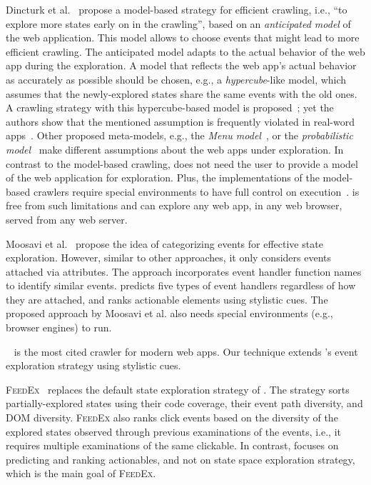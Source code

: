 Dincturk et al.~\cite{Dincturk:2014:ModelBasedForRIA:TWEB} propose a model-based strategy for efficient crawling,
i.e., ``to explore more states early on in the crawling'',
based on an \textit{anticipated model} of the web application.
This model allows to choose events that might lead to more efficient crawling.
The anticipated model adapts to the actual behavior of the web app during the exploration.
A model that reflects the web app's actual behavior as accurately as possible should be chosen,
e.g., a \textit{hypercube}-like model,
which assumes that the newly-explored states share the same events with the old ones.
A crawling strategy with this hypercube-based model is proposed~\cite{Benjamin:2007:StrategyHypercube:Thesis, Benjamin:2011:StrategyHypercube:ICWE};
yet the authors show that the mentioned assumption is frequently violated in real-word apps~\cite{Dincturk:2014:ModelBasedForRIA:TWEB}.
Other proposed meta-models, e.g., the \textit{Menu model}~\cite{Choudhary:2012:MCrawler:Thesis, Choudhary:2013:MenuModel:ICWE},
or the \textit{probabilistic model}~\cite{Dincturk:2012:StatisticalStrategy, Dincturk:2013:ModelBasedCrawlingStrategy} make different assumptions about the web apps under exploration.
In contrast to the model-based crawling, \toolName does not need the user to provide a model of the web application for exploration.
Plus, the implementations of the model-based crawlers require special environments to have full control on \js execution~\cite{Dincturk:2014:ModelBasedForRIA:TWEB}.
\toolName is free from such limitations and can explore any web app, in any web browser, served from any web server.

Moosavi et al.~\cite{Moosavi:2013:ComponentBasedCrawling, Moosavi:2014:ComponentBasedCrawlingICWE} propose the idea of categorizing events for effective state exploration.
However, similar to other approaches, it only considers events attached
via \html attributes.
The approach incorporates \js event handler function names to identify similar events.
\toolName predicts five types of event handlers regardless of how they are attached,
and ranks actionable elements using stylistic cues.
The proposed approach by Moosavi et al. also needs special environments (e.g., browser engines) to run. 

\crawljax~\cite{Mesbah:2012:Crawljax}
is the most cited crawler for modern web apps.
Our technique extends \crawljax's event exploration strategy using stylistic cues.

\textsc{FeedEx}~\cite{MilaniFard:2013:FeedEx}
replaces the default state exploration strategy of \crawljax. 
The strategy sorts partially-explored states using their
\js code coverage, their event path diversity, and DOM diversity.
\textsc{FeedEx} also ranks click events
based on the diversity of the explored states
observed through previous examinations of the events,
i.e., it requires multiple examinations of the same clickable.
In contrast, \toolName focuses on predicting and ranking actionables,
and not on state space exploration strategy, which is the main goal of \textsc{FeedEx}.

